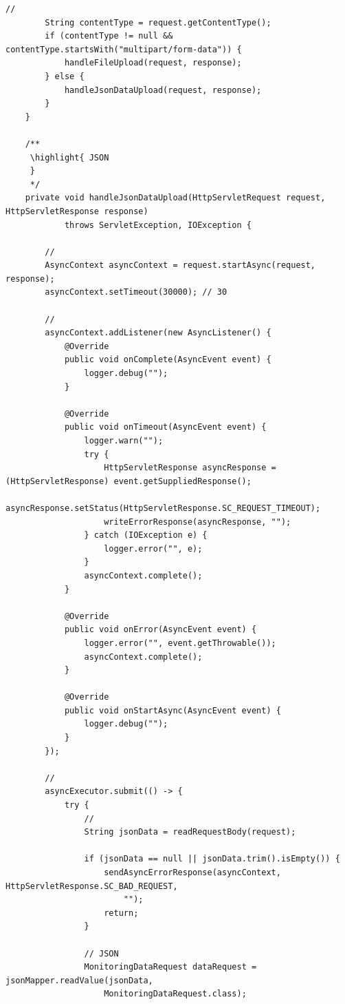 \begin{lstlisting}[style=java]
        // 
        String contentType = request.getContentType();
        if (contentType != null && contentType.startsWith("multipart/form-data")) {
            handleFileUpload(request, response);
        } else {
            handleJsonDataUpload(request, response);
        }
    }
    
    /**
     \highlight{ JSON
     } 
     */
    private void handleJsonDataUpload(HttpServletRequest request, HttpServletResponse response) 
            throws ServletException, IOException {
        
        // 
        AsyncContext asyncContext = request.startAsync(request, response);
        asyncContext.setTimeout(30000); // 30
        
        // 
        asyncContext.addListener(new AsyncListener() {
            @Override
            public void onComplete(AsyncEvent event) {
                logger.debug("");
            }
            
            @Override
            public void onTimeout(AsyncEvent event) {
                logger.warn("");
                try {
                    HttpServletResponse asyncResponse = (HttpServletResponse) event.getSuppliedResponse();
                    asyncResponse.setStatus(HttpServletResponse.SC_REQUEST_TIMEOUT);
                    writeErrorResponse(asyncResponse, "");
                } catch (IOException e) {
                    logger.error("", e);
                }
                asyncContext.complete();
            }
            
            @Override
            public void onError(AsyncEvent event) {
                logger.error("", event.getThrowable());
                asyncContext.complete();
            }
            
            @Override
            public void onStartAsync(AsyncEvent event) {
                logger.debug("");
            }
        });
        
        // 
        asyncExecutor.submit(() -> {
            try {
                // 
                String jsonData = readRequestBody(request);
                
                if (jsonData == null || jsonData.trim().isEmpty()) {
                    sendAsyncErrorResponse(asyncContext, HttpServletResponse.SC_BAD_REQUEST, 
                        "");
                    return;
                }
                
                // JSON
                MonitoringDataRequest dataRequest = jsonMapper.readValue(jsonData, 
                    MonitoringDataRequest.class);
                

\end{lstlisting}
